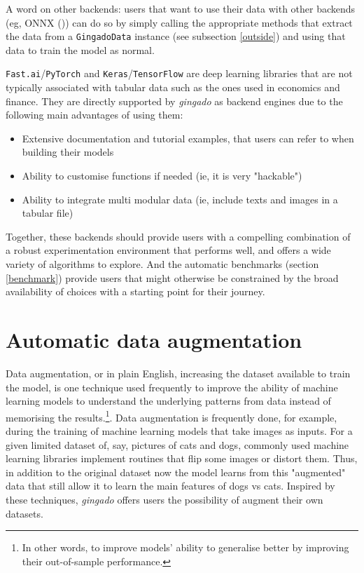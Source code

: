 \documentclass{article}
\begin{document}
A word on other backends: users that want to use their data with other backends (eg, ONNX (\cite{onnx})) can do so by simply calling the appropriate methods that extract the data from a \texttt{GingadoData} instance (see subsection \ref{outside}) and using that data to train the model as normal.

\texttt{Fast.ai}/\texttt{PyTorch} and \texttt{Keras}/\texttt{TensorFlow} are deep learning libraries that are not typically associated with tabular data such as the ones used in economics and finance. They are directly supported by \textit{gingado} as backend engines due to the following main advantages of using them:
\begin{itemize}
    \item Extensive documentation and tutorial examples, that users can refer to when building their models
    \item Ability to customise functions if needed (ie, it is very "hackable")
    \item Ability to integrate multi modular data (ie, include texts and images in a tabular file)
\end{itemize}

Together, these backends should provide users with a compelling combination of a robust experimentation environment that performs well, and offers a wide variety of algorithms to explore. And the automatic benchmarks (section \ref{benchmark}) provide users that might otherwise be constrained by the broad availability of choices with a starting point for their journey.

\section{Automatic data augmentation}\label{augmentation}
Data augmentation, or in plain English, increasing the dataset available to train the model, is one technique used frequently to improve the ability of machine learning models to understand the underlying patterns from data instead of memorising the results.\footnote{In other words, to improve models' ability to generalise better by improving their out-of-sample performance.}. Data augmentation is frequently done, for example, during the training of machine learning models that take images as inputs. For a given limited dataset of, say, pictures of cats and dogs, commonly used machine learning libraries implement routines that flip some images or distort them. Thus, in addition to the original dataset now the model learns from this "augmented" data that still allow it to learn the main features of dogs vs cats. Inspired by these techniques, \textit{gingado} offers users the possibility of augment their own datasets.
\end{document}
